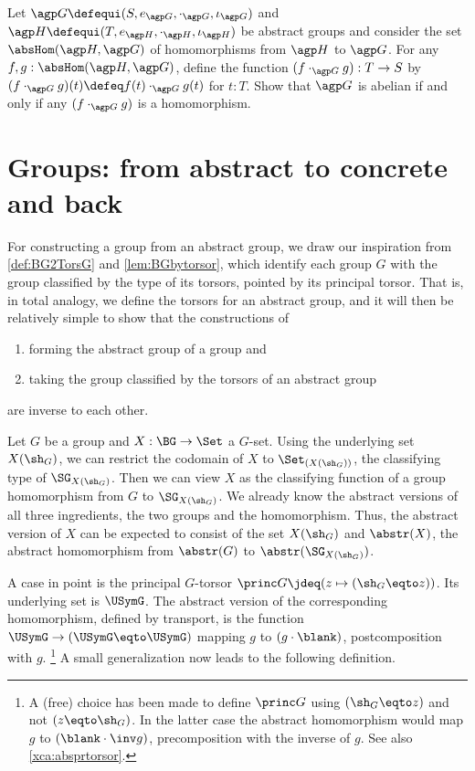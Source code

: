 \begin{xca}\label{xca:abshomaddition}
Let $\agp G\defequi(S,e_{\agp G},\cdot_{\agp G},\iota_{\agp G})$
and $\agp H\defequi(T,e_{\agp H},\cdot_{\agp H},\iota_{\agp H})$
be abstract groups and consider the set $\absHom(\agp H,\agp G)$
of homomorphisms from $\agp H$ to $\agp G$.
For any $f,g: \absHom(\agp H,\agp G)$, define
the function $(f\cdot_{\agp G}g): T\to S$
by $(f\cdot_{\agp G}g)(t)\defeq f(t)\cdot_{\agp G}g(t)$ for $t:T$.
Show that $\agp G$ is abelian if and only if
any $(f\cdot_{\agp G}g)$ is a homomorphism.
\end{xca}

\section{Groups: from abstract to concrete and back}
\label{sec:Gsetforabstract}

For constructing a group from an abstract group, we draw our inspiration
from \cref{def:BG2TorsG} and \cref{lem:BGbytorsor},
which identify each group $G$ with the group classified by
the type of its torsors, pointed by its principal torsor.
That is, in total analogy, we define the torsors for an abstract group,
and it will then be relatively simple to show that the constructions of
\begin{enumerate}
\item forming the abstract group of a group and
\item taking the group classified by the torsors of an abstract group
\end{enumerate}
 are inverse to each other.

Let $G$ be a group and $X:\BG\to\Set$ a $G$-set. Using the
underlying set $X(\sh_G)$, we can restrict the
codomain of $X$ to $\Set_{(X(\sh_G))}$, the classifying type of 
$\SG_{X(\sh_G)}$. Then we can view $X$ as the classifying function of 
a group homomorphism from $G$ to $\SG_{X(\sh_G)}$.
We already know the abstract versions of all three ingredients,
the two groups and the homomorphism. Thus, the abstract version
of $X$ can be expected to consist of the set $X(\sh_G)$ and 
$\abstr(X)$, the abstract homomorphism from $\abstr(G)$ 
to $\abstr(\SG_{X(\sh_G)})$.

A case in point is the principal $G$-torsor $\princ G \jdeq
(z\mapsto (\sh_G\eqto z))$. Its underlying set is $\USymG$.
The abstract version of the corresponding homomorphism,
defined by transport, is the function $\USymG\to(\USymG\eqto\USymG)$
mapping $g$ to $(g\cdot\blank)$, \ie postcomposition with $g$.%
\footnote{\label{ft:choicePshG}A (free) choice has been made to define 
$\princ G$ using $(\sh_G\eqto z)$ and not $(z\eqto\sh_G)$. In the latter
case the abstract homomorphism would map $g$ to $(\blank\cdot\inv g)$, \ie
precomposition with the inverse of $g$. See also \cref{xca:absprtorsor}.}
A small generalization now leads to the following definition.

